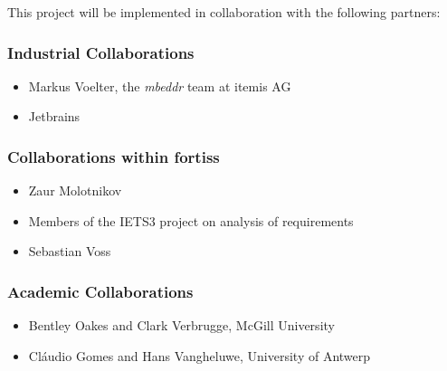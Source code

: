 This project will be implemented in collaboration with the following partners:

\subsubsection{Industrial Collaborations}
\begin{itemize}
  \item Markus Voelter, the \emph{mbeddr} team at itemis AG
  \item Jetbrains 
\end{itemize}

\subsubsection{Collaborations within fortiss}
\begin{itemize}
  \item Zaur Molotnikov
  \item Members of the IETS3 project on analysis of requirements
  \item Sebastian Voss
\end{itemize}

\subsubsection{Academic Collaborations}
\begin{itemize}
  \item Bentley Oakes and Clark Verbrugge, McGill University
  \item Cl\'audio Gomes and Hans Vangheluwe, University of Antwerp
\end{itemize}